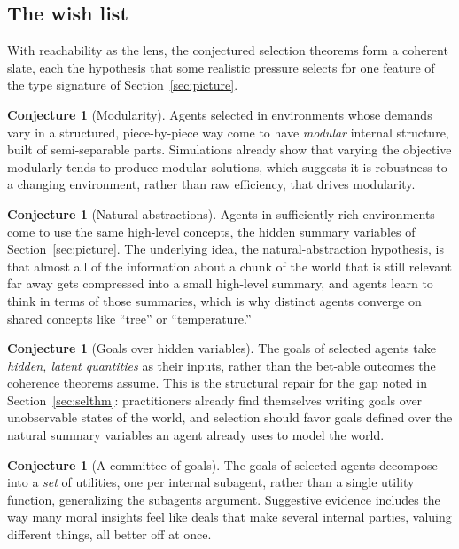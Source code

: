 \documentclass[10pt]{article}
\theoremstyle{definition}
\newtheorem{conjecture}[theorem]{Conjecture}
\theoremstyle{remark}
\begin{document}
\subsection{The wish list}

With reachability as the lens, the conjectured selection theorems form a coherent slate, each the hypothesis that some realistic pressure selects for one feature of the type signature of Section~\ref{sec:picture}.

\begin{conjecture}[Modularity]
Agents selected in environments whose demands vary in a structured, piece-by-piece way come to have \emph{modular} internal structure, built of semi-separable parts. Simulations already show that varying the objective modularly tends to produce modular solutions, which suggests it is robustness to a changing environment, rather than raw efficiency, that drives modularity.
\end{conjecture}

\begin{conjecture}[Natural abstractions]
Agents in sufficiently rich environments come to use the same high-level concepts, the hidden summary variables of Section~\ref{sec:picture}. The underlying idea, the natural-abstraction hypothesis, is that almost all of the information about a chunk of the world that is still relevant far away gets compressed into a small high-level summary, and agents learn to think in terms of those summaries, which is why distinct agents converge on shared concepts like ``tree'' or ``temperature.''
\end{conjecture}

\begin{conjecture}[Goals over hidden variables]
The goals of selected agents take \emph{hidden, latent quantities} as their inputs, rather than the bet-able outcomes the coherence theorems assume. This is the structural repair for the gap noted in Section~\ref{sec:selthm}: practitioners already find themselves writing goals over unobservable states of the world, and selection should favor goals defined over the natural summary variables an agent already uses to model the world.
\end{conjecture}

\begin{conjecture}[A committee of goals]
The goals of selected agents decompose into a \emph{set} of utilities, one per internal subagent, rather than a single utility function, generalizing the subagents argument. Suggestive evidence includes the way many moral insights feel like deals that make several internal parties, valuing different things, all better off at once.
\end{conjecture}
\end{document}
